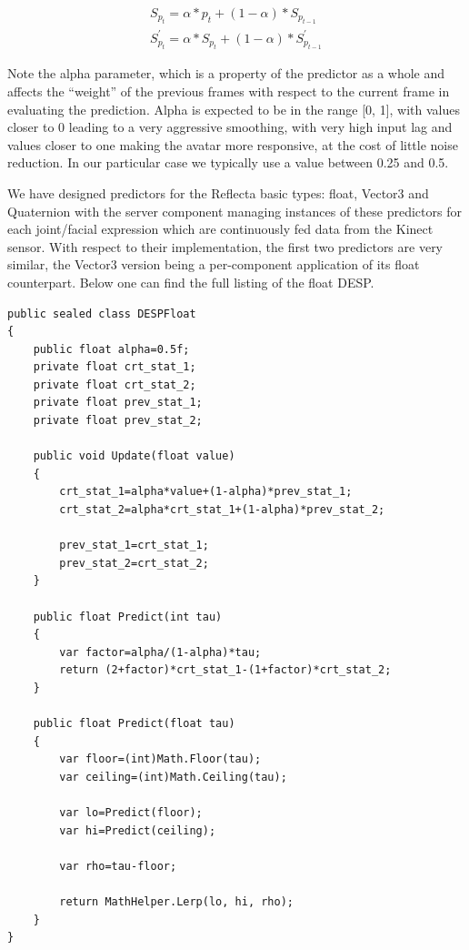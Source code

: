 \documentclass[a4paper, 12pt]{amsart}
\begin{document}
\begin{equation} \label{eq:desp_statistics}
\begin{split}
S_{p_{t}} = \alpha * p_{t} + (1 - \alpha) * S_{p_{t - 1}}
\\
S_{p_{t}}^{'} = \alpha * S_{p_{t}} + (1 - \alpha) * S_{p_{t - 1}}^{'}
\end{split}
\end{equation}

Note the alpha parameter, which is a property of the predictor as a whole and affects the ``weight'' of the previous frames with respect to the current frame in evaluating the prediction. Alpha is expected to be in the range [0, 1], with values closer to 0 leading to a very aggressive smoothing, with very high input lag and values closer to one making the avatar more responsive, at the cost of little noise reduction. In our particular case we typically use a value between 0.25 and 0.5.

We have designed predictors for the Reflecta basic types: float, Vector3 and Quaternion with the server component managing instances of these predictors for each joint/facial expression which are continuously fed data from the Kinect sensor. With respect to their implementation, the first two predictors are very similar, the Vector3 version being a per-component application of its float counterpart. Below one can find the full listing of the float DESP.

\begin{lstlisting}[basicstyle=\tiny]
public sealed class DESPFloat
{
    public float alpha=0.5f;
    private float crt_stat_1;
    private float crt_stat_2;
    private float prev_stat_1;
    private float prev_stat_2;

    public void Update(float value)
    {
        crt_stat_1=alpha*value+(1-alpha)*prev_stat_1;
        crt_stat_2=alpha*crt_stat_1+(1-alpha)*prev_stat_2;

        prev_stat_1=crt_stat_1;
        prev_stat_2=crt_stat_2;
    }

    public float Predict(int tau)
    {
        var factor=alpha/(1-alpha)*tau;
        return (2+factor)*crt_stat_1-(1+factor)*crt_stat_2;
    }

    public float Predict(float tau)
    {
        var floor=(int)Math.Floor(tau);
        var ceiling=(int)Math.Ceiling(tau);

        var lo=Predict(floor);
        var hi=Predict(ceiling);

        var rho=tau-floor;

        return MathHelper.Lerp(lo, hi, rho);
    }
}
\end{lstlisting}
\end{document}
